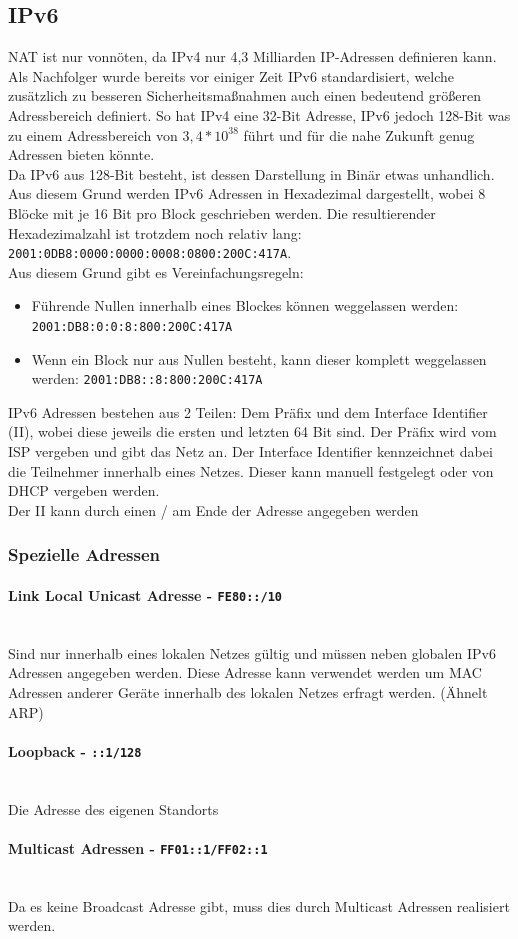 \documentclass{article}
\newcommand{\paragraphlb}[1]{\paragraph{#1}\mbox{}\\}
\begin{document}
	 \subsection{IPv6}
	 NAT ist nur vonnöten, da IPv4 nur 4,3 Milliarden IP-Adressen definieren kann. Als Nachfolger wurde bereits vor einiger Zeit IPv6 standardisiert, welche zusätzlich zu besseren Sicherheitsmaßnahmen auch einen bedeutend größeren Adressbereich definiert. So hat IPv4 eine 32-Bit Adresse, IPv6 jedoch 128-Bit was zu einem Adressbereich von $3,4*10^38$ führt und für die nahe Zukunft genug Adressen bieten könnte. \\
	 Da IPv6 aus 128-Bit besteht, ist dessen Darstellung in Binär etwas unhandlich. Aus diesem Grund werden IPv6 Adressen in Hexadezimal dargestellt, wobei 8 Blöcke mit je 16 Bit pro Block geschrieben werden. Die resultierender Hexadezimalzahl ist trotzdem noch relativ lang: \verb|2001:0DB8:0000:0000:0008:0800:200C:417A|.\\
	 Aus diesem Grund gibt es Vereinfachungsregeln:
	 \begin{itemize}
	  	\item{Führende Nullen innerhalb eines Blockes können weggelassen werden: \verb|2001:DB8:0:0:8:800:200C:417A|}
	  	\item{Wenn ein Block nur aus Nullen besteht, kann dieser komplett weggelassen werden: \verb|2001:DB8::8:800:200C:417A|}
	  \end{itemize} 
	  IPv6 Adressen bestehen aus 2 Teilen: Dem Präfix und dem Interface Identifier (II), wobei diese jeweils die ersten und letzten 64 Bit sind. Der Präfix wird vom ISP vergeben und gibt das Netz an. Der Interface Identifier kennzeichnet dabei die Teilnehmer innerhalb eines Netzes. Dieser kann manuell festgelegt oder von DHCP vergeben werden. \\
	  Der II kann durch einen / am Ende der Adresse angegeben werden
	  \subsubsection{Spezielle Adressen}
	  \paragraphlb{Link Local Unicast Adresse - \verb|FE80::/10| }
	  Sind nur innerhalb eines lokalen Netzes gültig und müssen neben globalen IPv6 Adressen angegeben werden. Diese Adresse kann verwendet werden um MAC Adressen anderer Geräte innerhalb des lokalen Netzes erfragt werden. (Ähnelt ARP)
	  \paragraphlb{Loopback - \verb|::1/128| }
	  Die Adresse des eigenen Standorts
	  \paragraphlb{Multicast Adressen - \verb|FF01::1/FF02::1| }
	  Da es keine Broadcast Adresse gibt, muss dies durch Multicast Adressen realisiert werden. 
\end{document}
